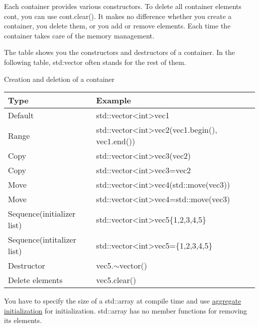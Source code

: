 Each container provides various constructors. To delete all container elements cont, you can use cont.clear(). It makes no difference whether you create a container, you delete them, or you add or remove elements. Each time the container takes care of the memory management.

The table shows you the constructors and destructors of a container. In the following table, std:vector often stands for the rest of them.

\begin{center}
Creation and deletion of a container
\end{center}

\begin{longtable}[c]{|l|l|}
\hline
\textbf{Type}   & \textbf{Example}                                            \\ \hline
\endfirsthead
%
\endhead
%
Default         & std::vector\textless{}int\textgreater vec1                  \\ \hline
Range                      & std::vector\textless{}int\textgreater vec2(vec1.begin(), vec1.end()) \\ \hline
Copy            & std::vector\textless{}int\textgreater vec3(vec2)            \\ \hline
Copy            & std::vector\textless{}int\textgreater vec3=vec2             \\ \hline
Move            & std::vector\textless{}int\textgreater vec4(std::move(vec3)) \\ \hline
Move            & std::vector\textless{}int\textgreater vec4=std::move(vec3)  \\ \hline
Sequence(initializer list) & std::vector\textless{}int\textgreater vec5\{1,2,3,4,5\}              \\ \hline
Sequence(intitalizer list) & std::vector\textless{}int\textgreater vec5=\{1,2,3,4,5\}             \\ \hline
Destructor      & vec5.$\sim$vector()                                         \\ \hline
Delete elements & vec5.clear()                                                \\ \hline
\end{longtable}

You have to specify the size of a std::array at compile time and use \href{https://en.cppreference.com/w/cpp/language/aggregate_initialization}{aggregate initialization} for initialization. std::array has no member functions for removing its elements.

